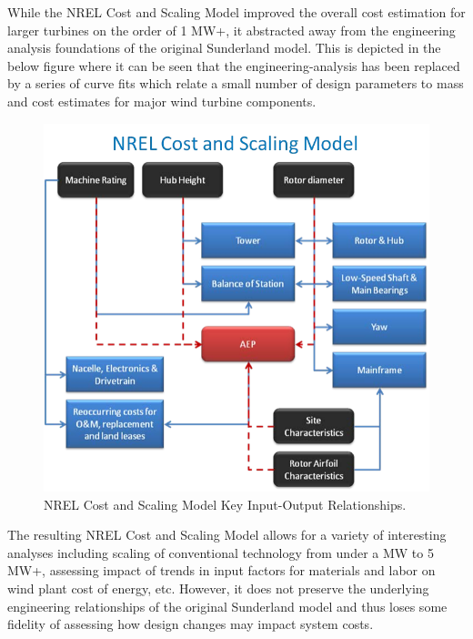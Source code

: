 \documentclass[letterpaper,10pt,openany,oneside]{sphinxmanual}
\begin{document}
While the NREL Cost and Scaling Model improved the overall cost estimation for larger turbines on the order of 1 MW+, it abstracted away from the engineering analysis foundations of the original Sunderland model.  This is depicted in the below figure where it can be seen that the engineering-analysis has been replaced by a series of curve fits which relate a small number of design parameters to mass and cost estimates for major wind turbine components.
\begin{figure}[htbp]
\centering
\capstart

\includegraphics[width=5.5in]{NRELCSM.pdf}
\caption{NREL Cost and Scaling Model Key Input-Output Relationships.}\label{theory:nrelcsm}\end{figure}

The resulting NREL Cost and Scaling Model allows for a variety of interesting analyses including scaling of conventional technology from under a MW to 5 MW+, assessing impact of trends in input factors for materials and labor on wind plant cost of energy, etc.  However, it does not preserve the underlying engineering relationships of the original Sunderland model and thus loses some fidelity of assessing how design changes may impact system costs.
\end{document}
